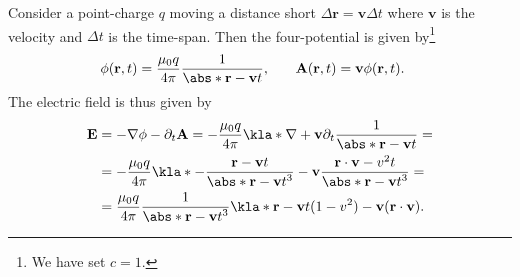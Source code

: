 \documentclass[english, parskip=full]{scrartcl}
\title{\titel}
\author{\autor}
\date{\today}
\begin{document}
\maketitle  %

Consider a point-charge $q$ moving a distance short $\Delta\textbf{r}=\textbf{v}\Delta t$ where $\textbf{v}$ is the velocity and $\Delta t$ is the time-span.
Then the four-potential is given by\footnote{We have set $c=1$.}
\begin{align}
\phi(\textbf{r},t) &= \frac{\mu_0q}{4\pi} \frac{1}{\abs*{\textbf{r} - \textbf{v}t}}, &&& \textbf{A}(\textbf{r},t) &= \textbf{v} \phi(\textbf{r},t).
\end{align}
The electric field is thus given by
\begin{align}
\textbf{E} &= -\nabla \phi - \partial_t \textbf{A} = - \frac{\mu_0 q}{4\pi} \kla*{\nabla + \textbf{v} \partial_t} \frac{1}{\abs*{\textbf{r} - \textbf{v} t}} = \\
&= - \frac{\mu_0 q}{4\pi} \kla*{ -\frac{\textbf{r} - \textbf{v}t}{\abs*{\textbf{r} - \textbf{v} t}^3} - \textbf{v} \frac{\textbf{r} \cdot \textbf{v} - v^2t}{\abs*{\textbf{r} - \textbf{v} t}^3}} = \\
&= \frac{\mu_0q}{4\pi} \frac{1}{\abs*{\textbf{r} - \textbf{v} t}^3} \kla*{ \textbf{r} - \textbf{v} t(1 - v^2) - \textbf{v} (\textbf{r} \cdot \textbf{v})}.
\end{align}
\end{document}
